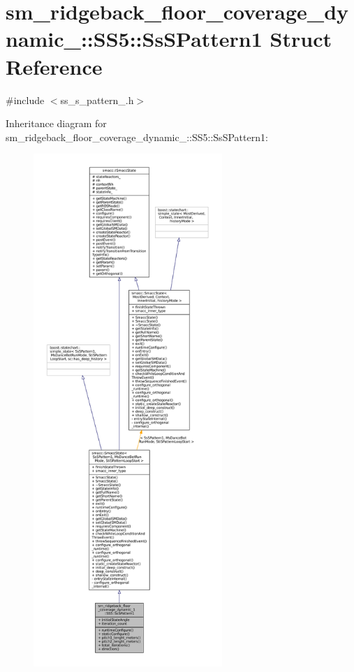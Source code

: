 \hypertarget{structsm__ridgeback__floor__coverage__dynamic__1_1_1SS5_1_1SsSPattern1}{}\section{sm\+\_\+ridgeback\+\_\+floor\+\_\+coverage\+\_\+dynamic\+\_\+:\+:S\+S5\+:\+:Ss\+S\+Pattern1 Struct Reference}
\label{structsm__ridgeback__floor__coverage__dynamic__1_1_1SS5_1_1SsSPattern1}


{\ttfamily \#include $<$ss\+\_\+s\+\_\+pattern\+\_.\+h$>$}



Inheritance diagram for sm\+\_\+ridgeback\+\_\+floor\+\_\+coverage\+\_\+dynamic\+\_\+:\+:S\+S5\+:\+:Ss\+S\+Pattern1\+:
\nopagebreak
\begin{figure}[H]
\begin{center}
\leavevmode
\includegraphics[height=550pt]{structsm__ridgeback__floor__coverage__dynamic__1_1_1SS5_1_1SsSPattern1__inherit__graph}
\end{center}
\end{figure}


